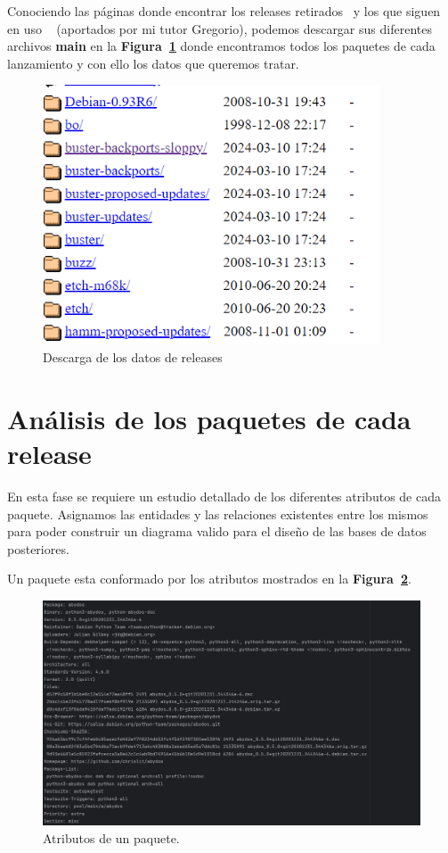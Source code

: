 \documentclass[a4paper, 12pt]{book}
\begin{document}
Conociendo las páginas donde encontrar los releases retirados~\cite{debian:_releases_archive} y los que siguen en uso ~\cite{debian:_releases} (aportados por mi tutor Gregorio), podemos descargar sus diferentes archivos \textbf{main} en la \textbf{Figura~\ref{fig:Descarga_releases}} donde encontramos todos los paquetes de cada lanzamiento y con ello los datos que queremos tratar.



\begin{figure}
	\centering
	\includegraphics[width=10cm, keepaspectratio]{img/releases.png}
	\caption{Descarga de los datos de releases}
	\label{fig:Descarga_releases}
\end{figure}

\section{Análisis de los paquetes de cada release} 
\label{sec:analisis_de_los_paquetes}

En esta fase se requiere un estudio detallado de los diferentes atributos de cada paquete. Asignamos las entidades y las relaciones existentes entre los mismos para poder construir un diagrama valido para el diseño de las bases de datos posteriores.

Un paquete esta conformado por los atributos mostrados en la \textbf {Figura~\ref{fig:paquete}}.

\begin{figure}
	\centering
	\includegraphics[width=15cm, keepaspectratio]{img/paquete.png}
	\caption{Atributos de un paquete.}
	\label{fig:paquete}
\end{figure}
\end{document}
